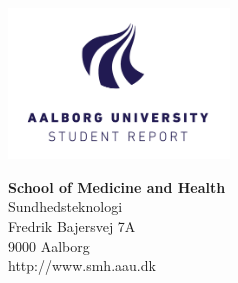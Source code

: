 

{}
\thispagestyle{empty}

\begin{minipage}[t]{0.48\textwidth}
\vspace*{-25pt}			%
\includegraphics[height=4cm]{billeder/AAU-logo-stud-UK-RGB}
\end{minipage}
\hfill
\begin{minipage}[t]{0.48\textwidth}
{\small 
\textbf{School of Medicine and Health}  \\
Sundhedsteknologi \\
Fredrik Bajersvej 7A \\
9000 Aalborg \\
http://www.smh.aau.dk}
\end{minipage}

\vspace*{1cm}

